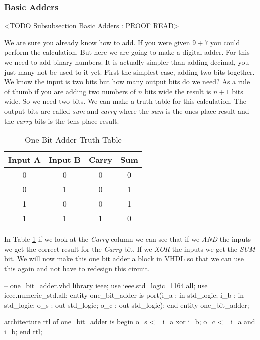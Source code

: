 	
\subsubsection{Basic Adders}
	<TODO Subsubsection  Basic Adders : PROOF READ>

We are sure you already know how to add. If you were given $9+7$ you could perform the calculation. But here we are going to make a digital adder. For this we need to add binary numbers. It is actually simpler than adding decimal, you just many not be used to it yet. First the simplest case, adding two bits together. We know the input is two bits but how many output bits do we need? As a rule of thumb if you are adding two numbers of $n$ bits wide the result is $n+1$ bits wide. So we need two bits. We can make a truth table for this calculation. The output bits are called \emph{sum} and \emph{carry} where the \emph{sum} is the ones place result and the \emph{carry} bits is the tens place result.

\begin{table}[h!]  
\begin{center}    
\caption{One Bit Adder Truth Table} 
\label{tab:tt2ba} 
\begin{tabular}{|c|c|c|c|}  
\textbf{Input A} & \textbf{Input B} & \textbf{Carry} & \textbf{Sum}\\  
\hline  
0 & 0 & 0 & 0\\  
0 & 1 & 0 & 1\\  
1 & 0 & 0 & 1\\  
1 & 1 & 1 & 0\\ 
\end{tabular}  
\end{center}
\end{table}
	
In Table \ref{tab:tt2ba} if we look at the \emph{Carry} column we can see that if we \emph{AND} the inputs we get the correct result for the \emph{Carry} bit. If we \emph{XOR} the inputs we get the \emph{SUM} bit. We will now make this one bit adder a block in \ac{VHDL} so that we can use this again and not have to redesign this circuit.

\begin{VHDLlisting}[tabsize=4]
-- one_bit_adder.vhd
library ieee; 
	use ieee.std_logic_1164.all; 
	use ieee.numeric_std.all; 
entity one_bit_adder is
port(i_a : in    std_logic;  
     i_b : in    std_logic;  
	 o_s :   out std_logic;  
	 o_c :   out std_logic);
end entity one_bit_adder;

architecture rtl of one_bit_adder is
begin 
	o_s <= i_a xor i_b; 
	o_c <= i_a and i_b;
end rtl;
\end{VHDLlisting}

